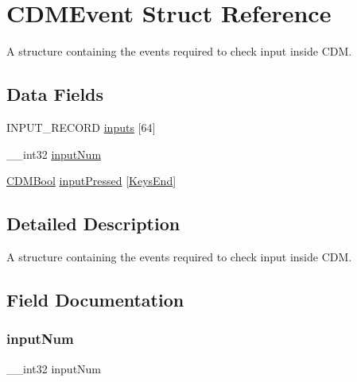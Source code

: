 \hypertarget{struct_c_d_m_event}{}\section{C\+D\+M\+Event Struct Reference}
\label{struct_c_d_m_event}


A structure containing the events required to check input inside C\+DM.  


\subsection*{Data Fields}
\begin{DoxyCompactItemize}
\item 
I\+N\+P\+U\+T\+\_\+\+R\+E\+C\+O\+RD \mbox{\hyperlink{struct_c_d_m_event_aa410219eafdce1e5eddb4770d9e84288}{inputs}} \mbox{[}64\mbox{]}
\item 
\+\_\+\+\_\+int32 \mbox{\hyperlink{struct_c_d_m_event_a8710349fb6cd8007331d453943ee67bc}{input\+Num}}
\item 
\mbox{\hyperlink{_c_d_m_8h_af5296d3141c193195e69417d1825228b}{C\+D\+M\+Bool}} \mbox{\hyperlink{struct_c_d_m_event_a0a068f50666a0d8b50e12592c39e7b25}{input\+Pressed}} \mbox{[}\mbox{\hyperlink{_c_d_m_8h_a8e7d3f25fc77053719b079b29784115fa1a4729fd774e28757eb8b774f4866422}{Keys\+End}}\mbox{]}
\end{DoxyCompactItemize}


\subsection{Detailed Description}
A structure containing the events required to check input inside C\+DM. 

\subsection{Field Documentation}
\mbox{\label{struct_c_d_m_event_a8710349fb6cd8007331d453943ee67bc}} 
\subsubsection{\texorpdfstring{input\+Num}{inputNum}}
{\footnotesize\ttfamily \+\_\+\+\_\+int32 input\+Num}

\mbox{\label{struct_c_d_m_event_a0a068f50666a0d8b50e12592c39e7b25}} 
